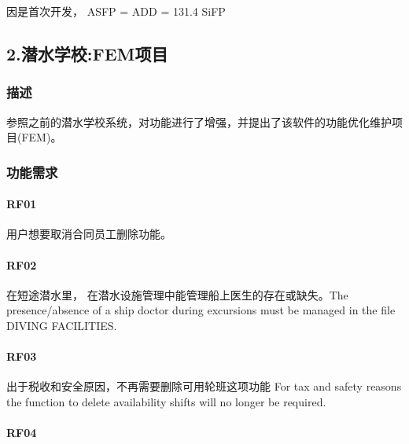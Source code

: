 因是首次开发， ASFP = ADD = 131.4 SiFP

\hypertarget{ux6f5cux6c34ux5b66ux6821femux9879ux76ee}{%
\subsection{2.潜水学校:FEM项目}\label{ux6f5cux6c34ux5b66ux6821femux9879ux76ee}}

\hypertarget{ux63cfux8ff0-1}{%
\subsubsection{描述}\label{ux63cfux8ff0-1}}

参照之前的潜水学校系统，对功能进行了增强，并提出了该软件的功能优化维护项目(FEM)。

\hypertarget{ux529fux80fdux9700ux6c42-1}{%
\subsubsection{功能需求}\label{ux529fux80fdux9700ux6c42-1}}

\hypertarget{rf01-1}{%
\paragraph{RF01}\label{rf01-1}}

用户想要取消合同员工删除功能。

\hypertarget{rf02-1}{%
\paragraph{RF02}\label{rf02-1}}

在短途潜水里， 在潜水设施管理中能管理船上医生的存在或缺失。The
presence/absence of a ship doctor during excursions must be managed in
the file DIVING FACILITIES.

\hypertarget{rf03-1}{%
\paragraph{RF03}\label{rf03-1}}

出于税收和安全原因，不再需要删除可用轮班这项功能 For tax and safety
reasons the function to delete availability shifts will no longer be
required.

\hypertarget{rf04-1}{%
\paragraph{RF04}\label{rf04-1}}

